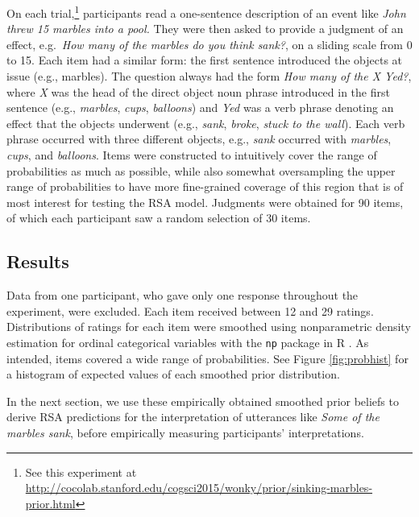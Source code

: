 \documentclass[10pt,letterpaper]{article}
\newcommand{\red}[1]{\textcolor{Red}{#1}}
\newcommand{\figref}[1]{Figure \ref{#1}}
\begin{document}
On each trial,\footnote{See this experiment at \url{http://cocolab.stanford.edu/cogsci2015/wonky/prior/sinking-marbles-prior.html}} participants read a one-sentence description of an event like \emph{John threw 15 marbles into a pool.} They were then asked to provide a judgment of an effect, e.g.~\emph{How many of the marbles do you think sank?}, on a sliding scale from 0 to 15. Each item had a similar form: the first sentence introduced the objects at issue (e.g., marbles). The question always had the form \emph{How many of the X Yed?}, where \emph{X} was the head of the direct object noun phrase introduced in the first sentence (e.g., \emph{marbles}, \emph{cups}, \emph{balloons}) and \emph{Yed} was a verb phrase denoting an effect that the objects underwent (e.g., \emph{sank}, \emph{broke}, \emph{stuck to the wall}). Each verb phrase occurred with three different objects, e.g., \emph{sank} occurred with \emph{marbles}, \emph{cups}, and \emph{balloons}. Items were constructed to intuitively cover the range of probabilities as much as possible, while also somewhat oversampling the upper range of probabilities to have more fine-grained coverage of this region that is of most interest for testing the RSA model. Judgments were obtained for 90 items, of which each participant saw a random selection of 30 items. 


\subsection{Results}

Data from one participant, who gave only one response throughout the experiment, were excluded. Each item received between 12 and 29 ratings. Distributions of ratings for each item were smoothed using nonparametric density estimation for ordinal categorical variables \cite{liracine2003} with the \verb|np| package in R \cite{hayfield2008}. As intended, items covered a wide range of probabilities. See \figref{fig:probhist} for a histogram of expected values of each smoothed prior distribution.



In the next section, we use these empirically obtained smoothed prior beliefs to derive RSA predictions for the interpretation of utterances like \emph{Some of the marbles sank}, before empirically measuring participants' interpretations.
\end{document}
